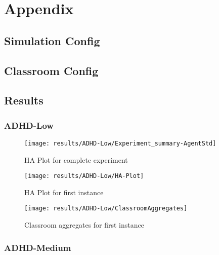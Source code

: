 \chapter{Appendix}
\label{AppendixChapter}

\label{ApxSimulationConfig}
\section{Simulation Config}


\label{ApxClassroomProfile}
\section{Classroom Config}


\label{ApxResults}


\section{Results}

\subsection{ADHD-Low}

\begin{figure}[H]
    \centering
    \texttt{[image: results/ADHD-Low/Experiment\_summary-AgentStd]}
    \caption{HA Plot for complete experiment}
\end{figure}

\begin{figure}[H]
    \centering
    \texttt{[image: results/ADHD-Low/HA-Plot]}
    \caption{HA Plot for first instance}
\end{figure}

\begin{figure}[H]
    \centering
    \texttt{[image: results/ADHD-Low/ClassroomAggregates]}
    \caption{Classroom aggregates for first instance}
\end{figure}


\subsection{ADHD-Medium}

